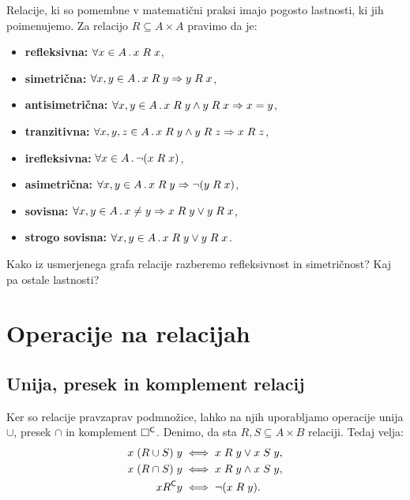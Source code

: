 Relacije, ki so pomembne v matematični praksi imajo pogosto lastnosti, ki jih poimenujemo. Za relacijo $R \subseteq A \times A$ pravimo da je:
%
\begin{itemize}
  \item \textbf{refleksivna:} $\forall x \in A \,.\, x \mathrel{R} x$,
  \item \textbf{simetrična:} $\forall x, y \in A \,.\, x \mathrel{R} y \Rightarrow y \mathrel{R} x$,
  \item \textbf{antisimetrična:} $\forall x, y \in A \,.\, x \mathrel{R} y \land y \mathrel{R} x \Rightarrow x = y$,
  \item \textbf{tranzitivna:} $\forall x, y, z \in A \,.\, x \mathrel{R} y \land y \mathrel{R} z \Rightarrow x \mathrel{R} z$,
  \item \textbf{irefleksivna:} $\forall x \in A \,.\, \lnot (x \mathrel{R} x)$,
  \item \textbf{asimetrična:} $\forall x, y \in A \,.\, x \mathrel{R} y \Rightarrow \lnot (y \mathrel{R} x)$,
  \item \textbf{sovisna:} $\forall x, y \in A \,.\, x \neq y \Rightarrow x \mathrel{R} y \lor y \mathrel{R} x$,
  \item \textbf{strogo sovisna:} $\forall x, y \in A \,.\, x \mathrel{R} y \lor y \mathrel{R} x$.
\end{itemize}
%

\begin{vaja}
  Kako iz usmerjenega grafa relacije razberemo refleksivnost in simetričnost? Kaj pa ostale lastnosti?
\end{vaja}

\section{Operacije na relacijah}

\subsection{Unija, presek in komplement relacij}

Ker so relacije pravzaprav podmnožice, lahko na njih uporabljamo operacije unija $\cup$,
presek $\cap$ in komplement $\Box^{\mathsf{C}}$. Denimo, da sta $R, S \subseteq A \times B$ relaciji. Tedaj velja:
%
\begin{align*}
  x \mathrel{(R \cup S)} y &\iff x \mathrel{R} y \lor x \mathrel{S} y, \\
  x \mathrel{(R \cap S)} y &\iff x \mathrel{R} y \land x \mathrel{S} y, \\
  x R^{\mathsf{C}} y &\iff \lnot (x \mathrel{R} y).
\end{align*}

